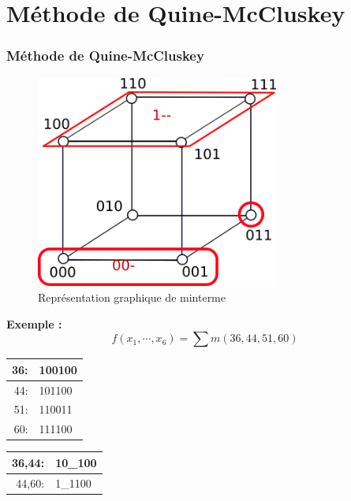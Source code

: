 \documentclass[handout]{beamer}
\newcommand{\tick}{\ding{52}}
\begin{document}
\section{M\'ethode de Quine-McCluskey}
\begin{frame}
  \frametitle{M\'ethode de Quine-McCluskey}


  
  \begin{figure}[p]
    \includegraphics[width=8cm]{cube_qm.png}
    \caption{Repr\'esentation graphique de minterme}
    \label{fig:cube1}
  \end{figure}
  
  \large{\textbf{Exemple :}} \[ f(x_1,\cdots,x_6) = \sum m(36, 44, 51, 60) \]

  
  \begin{minipage}[b]{0.5\hsize}\centering
    \begin{tabular}{rl}
      36: & 100100  \tick \\ \hline 
      44: & 101100  \tick \\ 
      51: & 110011   \\ \hline
      60: & 111100 \tick
    \end{tabular}
  \end{minipage}
  \begin{minipage}{0.4\hsize}\centering
    \begin{tabular}{rl}
      36,44: & 10\_100  \\ \hline 
      44,60: & 1\_1100    
    \end{tabular}
  \end{minipage}
  
  
  
\end{frame}
\end{document}
